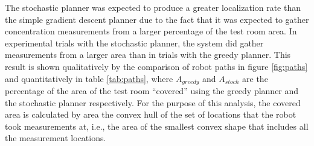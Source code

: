 \documentclass[submit, 12pt]{aiaa-pretty-modified}
\begin{document}
The stochastic planner was expected to produce a greater localization
rate than the simple gradient descent planner due to the fact that it
was expected to gather concentration measurements from a larger
percentage of the test room area.  In experimental trials with the
stochastic planner, the system did gather measurements from a larger
area than in trials with the greedy planner.  This result is shown
qualitatively by the comparison of robot paths in figure \ref{fig:paths} and
quantitatively in table \ref{tab:paths}, where $A_{greedy}$ and
$A_{stoch}$ are the percentage of the area of the test room ``covered''
using the greedy planner and the stochastic planner respectively.  For
the purpose of this analysis, the covered area is calculated by area the convex hull
of the set of locations that the robot took measurements at, i.e., the area of
the smallest convex shape that includes all the measurement locations.
\end{document}
